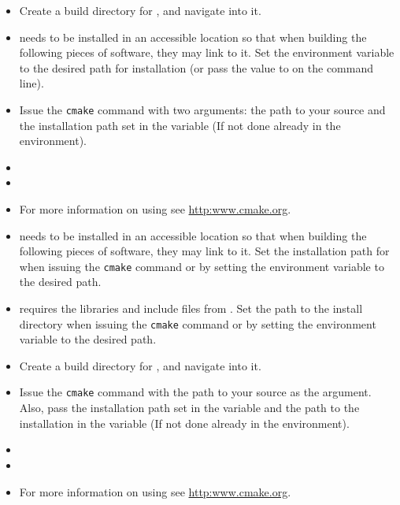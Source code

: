 \begin{itemize}
\item Create a build directory for , and navigate into it.
\item {} needs to be installed in an accessible location so that when building the following pieces of software, they may link to it. Set the environment variable  to the desired path for installation (or pass the value to  on the command line).
\item{Issue the \texttt{cmake} command with two arguments: the path to your  source and the installation path set in the   variable (If not done already in the environment).}

\item {}
\item {}
\item For more information on using  see \url{http:www.cmake.org}.
\end{itemize}


\begin{itemize}
\item \impact needs to be installed in an accessible location so that when building the following pieces of software, they may link to it. Set the installation path for \impact when issuing the \texttt{cmake} command or by setting the environment variable  to the desired path.
\item \impact requires the libraries and include files from . Set the path to the  install directory when issuing the \texttt{cmake} command or by setting the environment variable  to the desired path.
\item Create a build directory for \impact\!\!, and navigate into it.
\item{Issue the \texttt{cmake} command with the path to your \impact source as the argument. Also, pass the installation path set in the  variable and the path to the  installation in the  variable (If not done already in the environment).} \newline
{}
\item {}
\item {}
\item For more information on using  see \url{http:www.cmake.org}.
\end{itemize}

